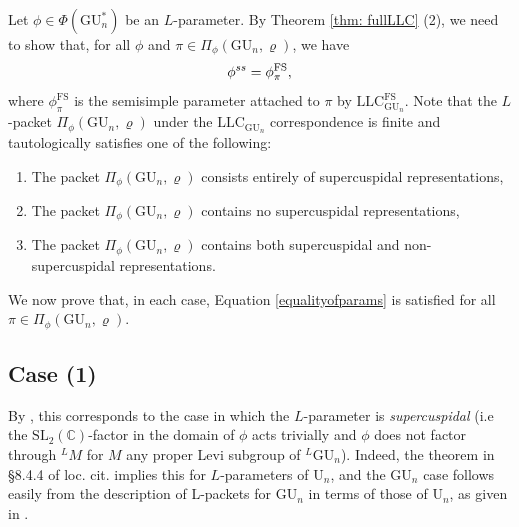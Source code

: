 \documentclass[reqno,11pt]{amsart}
\theoremstyle{remark}
\newcommand{\GU}{\mathrm{GU}}
\newcommand{\U}{\mathrm{U}}
\newcommand{\LL}{{}^L}
\newcommand{\SL}{\mathrm{SL}}
\newcommand{\LLC}{\mathrm{LLC}}
\begin{document}
Let $\phi \in \Phi(\GU^{*}_n)$ be an $L$-parameter. By Theorem \ref{thm: fullLLC} (2), we need to show that, for all $\phi$ and $\pi \in \Pi_{\phi}(\GU_n, \varrho)$, we have
\begin{equation}{\label{equalityofparams}}
    \phi^{ss} = \phi^{\mathrm{FS}}_{\pi},
\end{equation}
where $\phi^{\mathrm{FS}}_{\pi}$ is the semisimple parameter attached to $\pi$ by $\LLC^{\mathrm{FS}}_{\GU_n}$. Note that the $L$-packet $\Pi_{\phi}(\GU_n, \varrho)$ under the $\LLC_{\GU_n}$ correspondence is finite and tautologically satisfies one of the following:
\begin{enumerate}
    \item The packet $\Pi_{\phi}(\GU_n, \varrho)$ consists entirely of supercuspidal representations,\\
    \item The packet $\Pi_{\phi}(\GU_n, \varrho)$ contains no supercuspidal representations,\\
    \item The packet $\Pi_{\phi}(\GU_n, \varrho)$ contains both supercuspidal and non-supercuspidal representations.
\end{enumerate}
We now prove that, in each case, Equation \eqref{equalityofparams} is satisfied for all $\pi \in \Pi_{\phi}(\GU_n, \varrho)$.
\subsection{Case (1)}{\label{Case (1)}}
By \cite[\S 8.4.4]{Moe}, this corresponds to the case in which the $L$-parameter is \emph{supercuspidal} (i.e the $\SL_{2}(\mathbb{C})$-factor in the domain of $\phi$ acts trivially and $\phi$ does not factor through $\phantom{}^{L}M$ for $M$ any proper Levi subgroup of $\LL \GU_n$). Indeed, the theorem in \S8.4.4 of loc. cit. implies this for $L$-parameters of $\U_n$, and the $\GU_n$ case follows easily from the description of L-packets for $\GU_n$ in terms of those of $\U_n$, as given in \cite{BMN}. 
\end{document}
